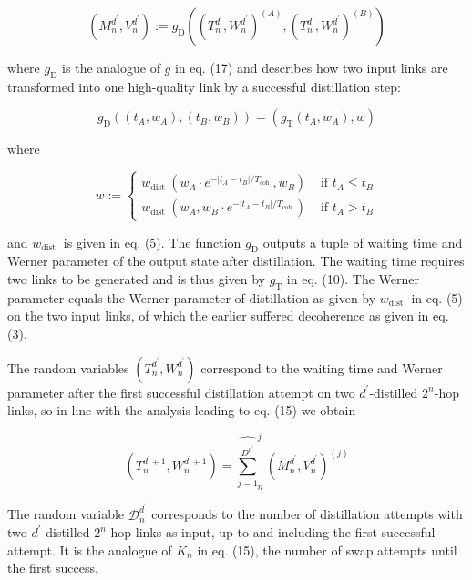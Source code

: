 \documentclass[10pt]{article}
\begin{document}
\begin{equation*}
\left(M_{n}^{d^{\prime}}, V_{n}^{d^{\prime}}\right):=g_{\mathrm{D}}\left(\left(T_{n}^{d^{\prime}}, W_{n}^{d^{\prime}}\right)^{(A)},\left(T_{n}^{d^{\prime}}, W_{n}^{d^{\prime}}\right)^{(B)}\right) \tag{23}
\end{equation*}


where $g_{\mathrm{D}}$ is the analogue of $g$ in eq. (17) and describes how two input links are transformed into one high-quality link by a successful distillation step:

$$
g_{\mathrm{D}}\left(\left(t_{A}, w_{A}\right),\left(t_{B}, w_{B}\right)\right)=\left(g_{\mathrm{T}}\left(t_{A}, w_{A}\right), w\right)
$$

where

$$
w:= \begin{cases}w_{\text {dist }}\left(w_{A} \cdot e^{-\left|t_{A}-t_{B}\right| / T_{\text {coh }}}, w_{B}\right) & \text { if } t_{A} \leq t_{B} \\ w_{\text {dist }}\left(w_{A}, w_{B} \cdot e^{-\left|t_{A}-t_{B}\right| / T_{\text {coh }}}\right) & \text { if } t_{A}>t_{B}\end{cases}
$$

and $w_{\text {dist }}$ is given in eq. (5). The function $g_{\mathrm{D}}$ outputs a tuple of waiting time and Werner parameter of the output state after distillation. The waiting time requires two links to be generated and is thus given by $g_{\mathrm{T}}$ in eq. (10). The Werner parameter equals the Werner parameter of distillation as given by $w_{\text {dist }}$ in eq. (5) on the two input links, of which the earlier suffered decoherence as given in eq. (3).

The random variables $\left(T_{n}^{d^{\prime}}, W_{n}^{d^{\prime}}\right)$ correspond to the waiting time and Werner parameter after the first successful distillation attempt on two $d^{\prime}$-distilled $2^{n}$-hop links, so in line with the analysis leading to eq. (15) we obtain


\begin{equation*}
\left(T_{n}^{d^{\prime}+1}, W_{n}^{d^{\prime}+1}\right)={\widehat{\sum_{j=1}^{D^{d^{\prime}}}}}_{n}^{j}\left(M_{n}^{d^{\prime}}, V_{n}^{d^{\prime}}\right)^{(j)} \tag{24}
\end{equation*}


The random variable $\mathcal{D}_{n}^{d^{\prime}}$ corresponds to the number of distillation attempts with two $d^{\prime}$-distilled $2^{n}$-hop links as input, up to and including the first successful attempt. It is the analogue of $K_{n}$ in eq. (15), the number of swap attempts until the first success.
\end{document}
